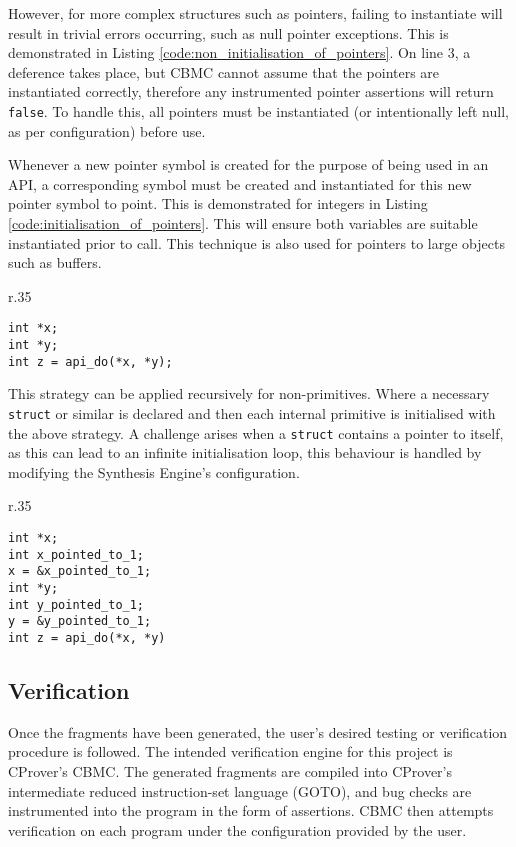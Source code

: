 \documentclass[EPiCempty]{easychair}
\begin{document}
However, for more complex structures such as pointers, failing to instantiate will result in trivial errors occurring, such as null pointer exceptions.  This is demonstrated in Listing \ref{code:non_initialisation_of_pointers}.  On line 3, a deference takes place, but CBMC cannot assume that the pointers are instantiated correctly, therefore any instrumented pointer assertions will return \texttt{false}.  To handle this, all pointers must be instantiated (or intentionally left null, as per configuration) before use.  

Whenever a new pointer symbol is created for the purpose of being used in an API, a corresponding symbol must be created and instantiated for this new pointer symbol to point.  This is demonstrated for integers in Listing \ref{code:initialisation_of_pointers}.  This will ensure both variables are suitable instantiated prior to call.  This technique is also used for pointers to large objects such as buffers.

\begin{wrapfigure}[7]{r}{.35\textwidth}
	\begin{lstlisting}[caption={Example of use of non-initialised pointers}, numbers=none, label={code:non_initialisation_of_pointers}]
int *x;
int *y;
int z = api_do(*x, *y);
	\end{lstlisting}
\end{wrapfigure}


This strategy can be applied recursively for non-primitives.  Where a necessary \texttt{struct} or similar is declared and then each internal primitive is initialised with the above strategy.  A challenge arises when a \texttt{struct} contains a pointer to itself, as this can lead to an infinite initialisation loop, this behaviour is handled by modifying the Synthesis Engine's configuration.  

\begin{wrapfigure}[11]{r}{.35\textwidth}
	\begin{lstlisting}[caption={Initialisation of pointers.}, numbers=none, label={code:initialisation_of_pointers}]
int *x;
int x_pointed_to_1;
x = &x_pointed_to_1;
int *y;
int y_pointed_to_1;
y = &y_pointed_to_1;
int z = api_do(*x, *y)
	\end{lstlisting}
\end{wrapfigure}



\subsection{Verification}
\label{sec:verification}
Once the fragments have been generated,  the user's desired testing or verification procedure is followed.  The intended verification engine for this project is CProver's CBMC.  The generated fragments are compiled into CProver's intermediate reduced instruction-set language (GOTO), and bug checks are instrumented into the program in the form of assertions.  CBMC then attempts verification on each program under the configuration provided by the user.
\end{document}
